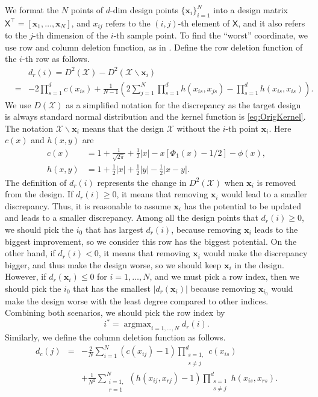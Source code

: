 \documentclass[graybox]{svmult}
\newcommand{\vx}{\boldsymbol{x}}
\newcommand{\mX}{{\mathsf X}}
\DeclareMathOperator{\argmax}{argmax}
\newcommand{\Xdes}{\mathcal{X}}
\def\abs#1{\ensuremath{\left \lvert #1 \right \rvert}}
\begin{document}
We format the $N$ points of $d$-dim design points $\{\vx_i\}_{i=1}^N$ into a design matrix  $\mX^\top =[\vx_1,\ldots, \vx_N]$, and $x_{ij}$ refers to the $(i,j)$-th element of $\mX$, and it also refers to the $j$-th dimension of the $i$-th sample point. 
To find the ``worst'' coordinate, we use row and column deletion function, as in \cite{kang2018stochastic}.
Define the row deletion function of the $i$-th row as follows. 
\begin{eqnarray}\label{eq:rowdeletion}
&& d_r(i) = D^2(\Xdes)-D^2(\Xdes\backslash \vx_i)\nonumber\\
&=& -2\prod\limits_{s=1}^dc(x_{is}) + \frac{1}{N-1}\left(2\sum_{j=1}^N\prod_{s=1}^d h(x_{is},x_{js})-\prod_{s=1}^d h(x_{is},x_{is})\right). 
\end{eqnarray}
We use $D(\Xdes)$ as a simplified notation for the discrepancy as the target design is always standard normal distribution and the kernel function is \eqref{eq:OrigKernel}. 
The notation $\Xdes\backslash \vx_i$ means that the design $\Xdes$ without the $i$-th point $\vx_i$. 
Here $c(x)$ and $h(x,y)$ are 
\begin{align*}
c(x) &= 1+\frac{1}{\sqrt{2\pi}}+\frac{1}{2}|x|-x[\Phi_1(x)-1/2]-\phi(x),\\
h(x,y) &= 1+\frac{1}{2}|x|+\frac{1}{2}|y|-\frac{1}{2}|x-y|.
\end{align*}
The definition of $d_r(i)$ represents the change in $D^2(\Xdes)$ when $\vx_i$ is removed from the design. 
If $d_r(i)\geq 0$, it means that removing $\vx_i$ would lead to a smaller discrepancy. 
Thus, it is reasonable to assume $\vx_i$ has the potential to be updated and leads to a smaller discrepancy. 
Among all the design points that $d_r(i)\geq 0$, we should pick the $i_0$ that has largest $d_r(i)$, because removing $\vx_i$ leads to the biggest improvement, so we consider this row has the biggest potential. 
On the other hand, if $d_r(i)< 0$, it means that removing $\vx_i$ would make the discrepancy bigger, and thus make the design worse, so we should keep $\vx_i$ in the design. 
However, if $d_r(\vx_i)\leq 0$ for $i=1,\ldots, N$, and we must pick a row index, then we should pick the $i_0$ that has the smallest $\abs{d_r(\vx_i)}$ because removing $\vx_{i_0}$ would make the design worse with the least degree compared to other indices. 
Combining both scenarios, we should pick the row index by 
\[
i^*=\argmax_{i=1,\ldots,N} d_r(i).
\]
Similarly, we define the column deletion function as follows. 
\begin{eqnarray}\label{eq:coldeletion}
d_c(j) &=& -\frac{2}{N}\sum_{i=1}^N(c(x_{ij})-1)\prod\limits_{\substack{s=1,\\ s\neq j}}^dc(x_{is})\nonumber\\ 
&&+\frac{1}{N^2}\sum_{\substack{i=1,\\ r=1}}^N\left(h(x_{ij},x_{rj})-1\right)\prod_{\substack{s=1\\s\neq j}}^d h(x_{is},x_{rs}).
\end{eqnarray}
\end{document}
